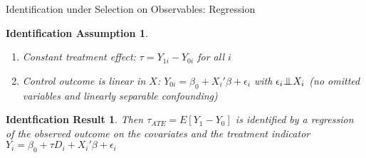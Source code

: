 \documentclass{beamer}
\numberwithin{equation}{section}
\newtheorem{iass}{Identification Assumption}
\newtheorem{ires}{Identfication Result}
\newcommand{\indep}{{\bot\negthickspace\negthickspace\bot}}
\begin{document}
\begin{frame}{Identification under Selection on Observables: Regression}

\begin{iass}

\begin{enumerate}

\item Constant treatment effect: $\tau = Y_{1i}-Y_{0i}$ for all $i$
\item Control outcome is linear in $X$: $Y_{0i} = \beta_0 + X_i' \beta + \epsilon_i$ with $\epsilon_i \indep X_i$ (no omitted variables and linearly separable confounding)

\end{enumerate}

\end{iass}

\begin{ires}

Then $\tau_{ATE}= E[Y_1-Y_0]$ is identified by a regression of the observed outcome on the covariates and the treatment indicator  $Y_i= \beta_0 + \tau D_i + X_i' \beta + \epsilon_i$

\end{ires}

\end{frame}
\end{document}

